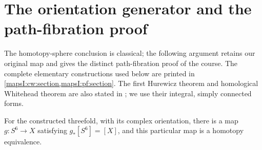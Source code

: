 \section{The orientation generator and the path-fibration proof}
\label{mapsI:course:homotopy-section}

The homotopy-sphere conclusion is classical; the following argument retains
our original map and gives the distinct path-fibration proof of the course.
The complete elementary constructions used below are printed in
\cref{mapsI:cw:section,mapsI:pf:section}.  The first Hurewicz theorem and
homological Whitehead theorem are also stated in
\cite[Theorem~4.32 and Corollary~4.33]{Hatcher2002}; we use their integral,
simply connected forms.

\begin{theorem}
\label{mapsI:course:CG-S6-07-HOMOTOPY}
For the constructed threefold, with its complex orientation, there is a
map \(g:S^6\to X\) satisfying \(g_*[S^6]=[X]\), and this particular map
is a homotopy equivalence.
\end{theorem}

